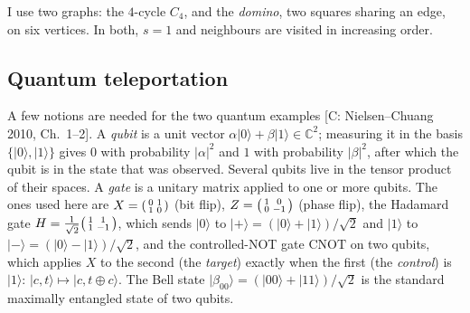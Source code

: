 \documentclass[11pt,a4paper]{article}
\providecommand{\ket}[1]{\lvert #1\rangle}
\newcommand{\gr}[1]{\textsf{[#1]}}
\begin{document}
I use two graphs: the $4$-cycle $C_4$, and the \emph{domino}, two squares sharing an edge, on six vertices. In both, $s=1$ and neighbours are visited in increasing order.

\begin{center}
\end{center}

\subsection{Quantum teleportation}

A few notions are needed for the two quantum examples \gr{C: Nielsen--Chuang 2010, Ch.~1--2}. A \emph{qubit} is a unit vector $\alpha\ket0+\beta\ket1\in\mathbb{C}^2$; measuring it in the basis $\{\ket0,\ket1\}$ gives $0$ with probability $|\alpha|^2$ and $1$ with probability $|\beta|^2$, after which the qubit is in the state that was observed. Several qubits live in the tensor product of their spaces. A \emph{gate} is a unitary matrix applied to one or more qubits. The ones used here are $X=\begin{psmallmatrix}0&1\\1&0\end{psmallmatrix}$ (bit flip), $Z=\begin{psmallmatrix}1&0\\0&-1\end{psmallmatrix}$ (phase flip), the Hadamard gate $H=\tfrac1{\sqrt2}\begin{psmallmatrix}1&1\\1&-1\end{psmallmatrix}$, which sends $\ket0$ to $\ket+=(\ket0+\ket1)/\sqrt2$ and $\ket1$ to $\ket-=(\ket0-\ket1)/\sqrt2$, and the controlled-NOT gate $\mathrm{CNOT}$ on two qubits, which applies $X$ to the second (the \emph{target}) exactly when the first (the \emph{control}) is $\ket1$: $\ket{c,t}\mapsto\ket{c,t\oplus c}$. The Bell state $\ket{\beta_{00}}=(\ket{00}+\ket{11})/\sqrt2$ is the standard maximally entangled state of two qubits.
\end{document}
